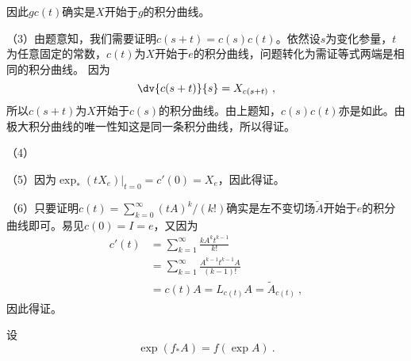因此$gc(t)$确实是$X$开始于$g$的积分曲线。


（3）由题意知，我们需要证明$c(s+t)=c(s)c(t)$。依然设$s$为变化参量，$t$为任意固定的常数，$c(t)$为$X$开始于$e$的积分曲线，问题转化为需证等式两端是相同的积分曲线。
因为
\begin{equation}
\dv{c(s+t)}{s}=X_{c(s+t)}~,
\end{equation}
所以$c(s+t)$为$X$开始于$c(s)$的积分曲线。由上题知，$c(s)c(t)$亦是如此。由极大积分曲线的唯一性知这是同一条积分曲线，所以得证。

（4）

（5）因为$\exp_*(tX_e)|_{t=0}=c'(0)=X_e$，因此得证。

（6）只要证明$c(t)=\sum^{\infty}_{k=0}(tA)^k/(k!)$确实是左不变切场$\widetilde A$开始于$e$的积分曲线即可。易见$c(0)=I=e$，又因为
\begin{equation}
\begin{aligned}
c'(t)&=\sum_{k=1}^\infty\frac{kA^kt^{k-1}}{k!}\\
&=\sum_{k=1}^\infty\frac{A^{k-1}t^{k-1}A}{(k-1)!}\\
&=c(t)A=L_{c(t)}A=\widetilde A_{c(t)}~,
\end{aligned}
\end{equation}
因此得证。

\begin{theorem}{}
设
\begin{equation}
\exp(f_*A)=f(\exp A)~.
\end{equation}
\end{theorem}
